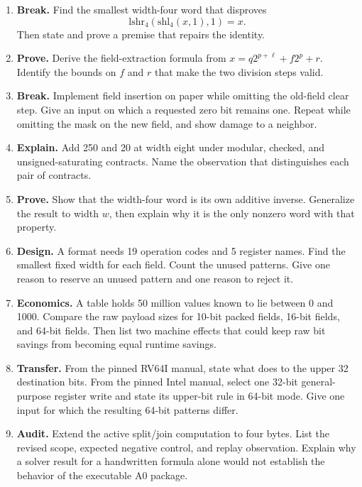 \begin{enumerate}
rule you used for the count 8.
\item \textbf{Break.} Find the smallest width-four word that disproves
\[
\mathrm{lshr}_4(\mathrm{shl}_4(x,1),1)=x.
\]
Then state and prove a premise that repairs the identity.
\item \textbf{Prove.} Derive the field-extraction formula from
\(x=q2^{p+\ell}+f2^p+r\). Identify the bounds on \(f\) and \(r\) that make the
two division steps valid.
\item \textbf{Break.} Implement field insertion on paper while omitting the
old-field clear step. Give an input on which a requested zero bit remains one.
Repeat while omitting the mask on the new field, and show damage to a neighbor.
\item \textbf{Explain.} Add 250 and 20 at width eight under modular, checked,
and unsigned-saturating contracts. Name the observation that distinguishes
each pair of contracts.
\item \textbf{Prove.} Show that the width-four word  is its own
additive inverse. Generalize the result to width \(w\), then explain why it is
the only nonzero word with that property.
\item \textbf{Design.} A format needs 19 operation codes and 5 register names.
Find the smallest fixed width for each field. Count the unused patterns. Give
one reason to reserve an unused pattern and one reason to reject it.
\item \textbf{Economics.} A table holds 50 million values known to lie between
0 and 1000. Compare the raw payload sizes for 10-bit packed fields, 16-bit
fields, and 64-bit fields. Then list two machine effects that could keep raw
bit savings from becoming equal runtime savings.
\item \textbf{Transfer.} From the pinned RV64I manual, state what 
does to the upper 32 destination bits. From the pinned Intel manual, select one
32-bit general-purpose register write and state its upper-bit rule in 64-bit
mode. Give one input for which the resulting 64-bit patterns differ.
\item \textbf{Audit.} Extend the active split/join computation to four bytes.
List the revised scope, expected negative control, and replay observation.
Explain why a solver result for a handwritten formula alone would not establish
the behavior of the executable A0 package.
\end{enumerate}
